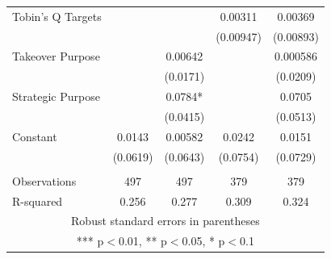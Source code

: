 \documentclass[12pt]{article}
\begin{document}
\begin{table}[ht]
\begin{adjustbox}{height=10cm, max width=\textwidth}
\begin{tabular}{lcccc}
			   Tobin's Q Targets &  &  & 0.00311 & 0.00369 \\
				&  &  & (0.00947) & (0.00893) \\
			   Takeover Purpose &  & 0.00642 &  & 0.000586 \\
				&  & (0.0171) &  & (0.0209) \\
			   Strategic Purpose &  & 0.0784* &  & 0.0705 \\
				&  & (0.0415) &  & (0.0513) \\
			   Constant & 0.0143 & 0.00582 & 0.0242 & 0.0151 \\
				& (0.0619) & (0.0643) & (0.0754) & (0.0729) \\
				&  &  &  &  \\
			   Observations & 497 & 497 & 379 & 379 \\
				R-squared & 0.256 & 0.277 & 0.309 & 0.324 \\ \hline
			   \multicolumn{5}{c}{ Robust standard errors in parentheses} \\
			   \multicolumn{5}{c}{ *** p$<$0.01, ** p$<$0.05, * p$<$0.1} \\
			 \end{tabular}
			   
		\end{adjustbox}
	\end{table}
\end{document}
